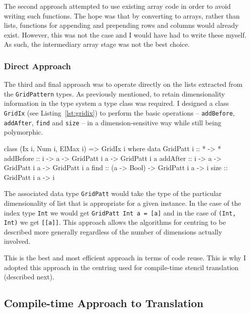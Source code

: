 \documentclass[
    12pt,
    a4paper,
    twoside,
    openright,
    ]{scrbook}
\begin{document}
The second approach attempted to use existing array code in order to avoid
writing such functions. The hope was that by converting to arrays, rather than
lists, functions for appending and prepending rows and columns would already
exist. However, this was not the case and I would have had to write these
myself. As such, the intermediary array stage was not the best choice.

\subsubsection{Direct Approach}

The third and final approach was to operate directly on the lists extracted from
the \texttt{GridPattern} types. As previously mentioned, to retain
dimensionality information in the type system a type class was required.  I
designed a class \texttt{GridIx} (see Listing~\ref{lst:gridix}) to perform the
basic operations -- \texttt{addBefore}, \texttt{addAfter}, \texttt{find} and
\texttt{size} -- in a dimension-sensitive way while still being polymorphic.

\begin{hflisting}[label={lst:gridix}, caption=The class declaration of
  \texttt{GridIx} showing the main functions defined for the grid manipulation
  and an associated data family.]
class (Ix i, Num i, ElMax i) => GridIx i where
    data GridPatt i :: * -> *
    addBefore :: i -> a -> GridPatt i a -> GridPatt i a
    addAfter :: i -> a -> GridPatt i a -> GridPatt i a
    find :: (a -> Bool) -> GridPatt i a -> i
    size :: GridPatt i a -> i
\end{hflisting}

The associated data type \texttt{GridPatt} would take the type of the particular
dimensionality of list that is appropriate for a given instance. In the case of
the index type \texttt{Int} we would get \texttt{GridPatt Int a = {[}a{]}} and
in the case of \texttt{(Int, Int)} we get \texttt{{[}{[}a{]}{]}}. This approach
allows the algorithms for centring to be described more generally regardless of
the number of dimensions actually involved.

This is the best and most efficient approach in terms of code reuse. This is why
I adopted this approach in the centring used for compile-time stencil
translation (described next).

\subsection{Compile-time Approach to Translation}
\label{sec:typesysapp}
\end{document}
